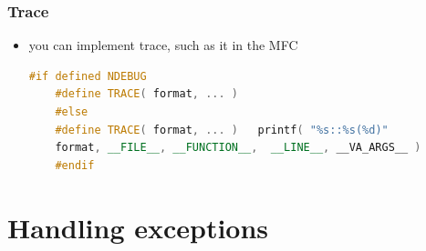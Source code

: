\documentclass[a4paper,12pt,twoside]{book}
\begin{document}
\subsubsection{Trace}
\begin{itemize}
	\item you can implement trace, such as it in the MFC
	\begin{lstlisting}[frame=single, language=c++]
	#if defined NDEBUG
	#define TRACE( format, ... )
	#else
	#define TRACE( format, ... )   printf( "%s::%s(%d)"
	format, __FILE__, __FUNCTION__,  __LINE__, __VA_ARGS__ )
	#endif
	\end{lstlisting}
	
\end{itemize}

\section{Handling exceptions}
\end{document}
